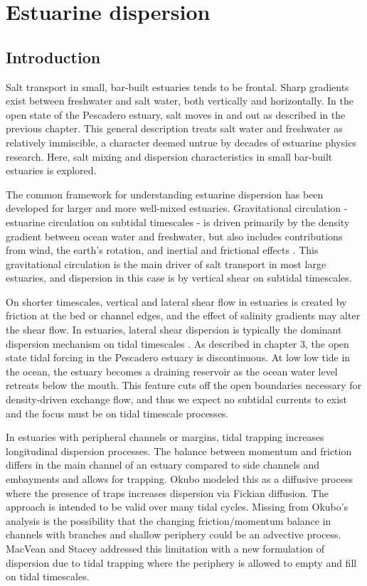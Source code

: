 \chapter{Estuarine dispersion}
\label{chSalt}


\section{Introduction}

Salt transport in small, bar-built estuaries tends to be frontal. Sharp gradients exist between freshwater and salt water, both vertically and horizontally. In the open state of the Pescadero estuary, salt moves in and out as described in the previous chapter. This general description treats salt water and freshwater as relatively immiscible, a character deemed untrue by decades of estuarine physics research. Here, salt mixing and dispersion characteristics in small bar-built estuaries is explored.


The common framework for understanding estuarine dispersion has been developed for larger and more well-mixed estuaries. Gravitational circulation - estuarine circulation on subtidal timescales - is driven primarily by the density gradient between ocean water and freshwater, but also includes contributions from wind, the earth's rotation, and inertial and frictional effects \parencite{fischer_mixing_1976}. This gravitational circulation is the main driver of salt transport in most large estuaries, and dispersion in this case is by vertical shear on subtidal timescales. 

On shorter timescales, vertical and lateral shear flow in estuaries is created by friction at the bed or channel edges, and the effect of salinity gradients may alter the shear flow. In estuaries, lateral shear dispersion is typically the dominant dispersion mechanism on tidal timescales \parencite{fischer_mixing_1979}. As described in chapter 3, the open state tidal forcing in the Pescadero estuary is discontinuous. At low low tide in the ocean, the estuary becomes a draining reservoir as the ocean water level retreats below the mouth. This feature cuts off the open boundaries necessary for density-driven exchange flow, and thus we expect no subtidal currents to exist and the focus must be on tidal timescale processes. 

In estuaries with peripheral channels or margins, tidal trapping increases longitudinal dispersion processes. The balance between momentum and friction differs in the main channel of an estuary compared to side channels and embayments and allows for trapping.  Okubo \parencite*{okubo_effect_1973} modeled this as a diffusive process where the presence of traps increases dispersion via Fickian diffusion. The approach is intended to be valid over many tidal cycles. Missing from Okubo's analysis is the possibility that the changing friction/momentum balance in channels with branches and shallow periphery could be an advective process. MacVean and Stacey \parencite*{macvean_estuarine_2011} addressed this limitation with a new formulation of dispersion due to tidal trapping where the periphery is allowed to empty and fill on tidal timescales.

